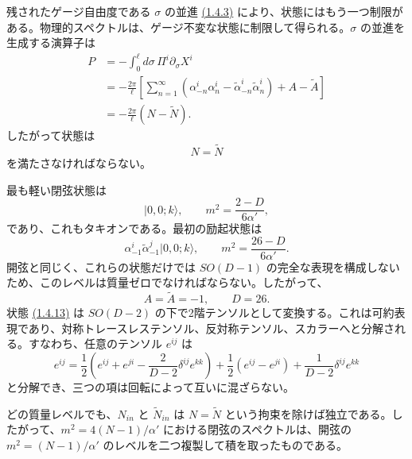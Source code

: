 残されたゲージ自由度である $\sigma$ の並進 \hyperref[eq:1.4.3]{(1.4.3)} により、状態にはもう一つ制限がある。物理的スペクトルは、ゲージ不変な状態に制限して得られる。$\sigma$ の並進を生成する演算子は
\begin{equation}
\begin{aligned}
P&=-\int_0^\ell d\sigma\,\Pi^i\partial_\sigma X^i\\
&=-\frac{2\pi}{\ell}\left[
\sum_{n=1}^\infty\left(\alpha_{-n}^i\alpha_n^i
-\widetilde\alpha_{-n}^i\widetilde\alpha_n^i\right)
+A-\widetilde A\right]\\
&=-\frac{2\pi}{\ell}(N-\widetilde N).
\end{aligned}
\tag{1.4.10}\label{eq:1.4.10}
\end{equation}
したがって状態は
\begin{equation}
N=\widetilde N
\tag{1.4.11}\label{eq:1.4.11}
\end{equation}
を満たさなければならない。

最も軽い閉弦状態は
\begin{equation}
\lvert0,0;k\rangle,\qquad m^2=\frac{2-D}{6\alpha'},
\tag{1.4.12}\label{eq:1.4.12}
\end{equation}
であり、これもタキオンである。最初の励起状態は
\begin{equation}
\alpha_{-1}^i\widetilde\alpha_{-1}^j\lvert0,0;k\rangle,
\qquad m^2=\frac{26-D}{6\alpha'}.
\tag{1.4.13}\label{eq:1.4.13}
\end{equation}
開弦と同じく、これらの状態だけでは $SO(D-1)$ の完全な表現を構成しないため、このレベルは質量ゼロでなければならない。したがって、
\begin{equation}
A=\widetilde A=-1,\qquad D=26.
\tag{1.4.14}\label{eq:1.4.14}
\end{equation}
状態 \hyperref[eq:1.4.13]{(1.4.13)} は $SO(D-2)$ の下で2階テンソルとして変換する。これは可約表現であり、対称トレースレステンソル、反対称テンソル、スカラーへと分解される。すなわち、任意のテンソル $e^{ij}$ は
\begin{equation}
e^{ij}=
\frac12\left(e^{ij}+e^{ji}-\frac{2}{D-2}\delta^{ij}e^{kk}\right)
+\frac12\left(e^{ij}-e^{ji}\right)
+\frac1{D-2}\delta^{ij}e^{kk}
\tag{1.4.15}\label{eq:1.4.15}
\end{equation}
と分解でき、三つの項は回転によって互いに混ざらない。

どの質量レベルでも、$N_{in}$ と $\widetilde N_{in}$ は $N=\widetilde N$ という拘束を除けば独立である。したがって、$m^2=4(N-1)/\alpha'$ における閉弦のスペクトルは、開弦の $m^2=(N-1)/\alpha'$ のレベルを二つ複製して積を取ったものである。

